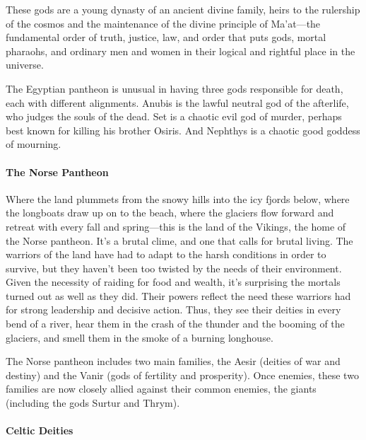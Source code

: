 \documentclass[
]{article}
\begin{document}
These gods are a young dynasty of an ancient divine family, heirs to the
rulership of the cosmos and the maintenance of the divine principle of
Ma'at---the fundamental order of truth, justice, law, and order that
puts gods, mortal pharaohs, and ordinary men and women in their logical
and rightful place in the universe.

The Egyptian pantheon is unusual in having three gods responsible for
death, each with different alignments. Anubis is the lawful neutral god
of the afterlife, who judges the souls of the dead. Set is a chaotic
evil god of murder, perhaps best known for killing his brother Osiris.
And Nephthys is a chaotic good goddess of mourning.

\hypertarget{the-norse-pantheon}{%
\paragraph{The Norse Pantheon}\label{the-norse-pantheon}}

Where the land plummets from the snowy hills into the icy fjords below,
where the longboats draw up on to the beach, where the glaciers flow
forward and retreat with every fall and spring---this is the land of the
Vikings, the home of the Norse pantheon. It's a brutal clime, and one
that calls for brutal living. The warriors of the land have had to adapt
to the harsh conditions in order to survive, but they haven't been too
twisted by the needs of their environment. Given the necessity of
raiding for food and wealth, it's surprising the mortals turned out as
well as they did. Their powers reflect the need these warriors had for
strong leadership and decisive action. Thus, they see their deities in
every bend of a river, hear them in the crash of the thunder and the
booming of the glaciers, and smell them in the smoke of a burning
longhouse.

The Norse pantheon includes two main families, the Aesir (deities of war
and destiny) and the Vanir (gods of fertility and prosperity). Once
enemies, these two families are now closely allied against their common
enemies, the giants (including the gods Surtur and Thrym).

\hypertarget{celtic-deities}{%
\paragraph{Celtic Deities}\label{celtic-deities}}
\end{document}
